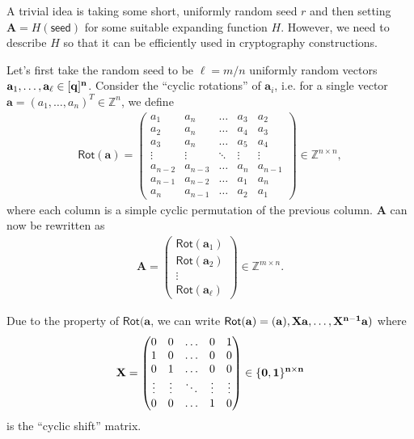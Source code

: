 \documentclass[cryptography,review,submit,pdftex,moreauthors,amsmath,amssymb,aps,strict]{Definitions/mdpi}
\begin{document}
A trivial idea is taking some short, uniformly random seed $r$ and then setting $\mathbf{A} = H(\textsf{seed})$ for some suitable expanding function $H$. However, we need to describe $H$ so that it can be efficiently used in cryptography constructions. 


Let's first take the random seed to be $\ell = m/n$ uniformly random vectors $\mathbf{a}_1,\dots,\bf{a_{\ell}}\in[q]^n$. Consider the ``cyclic rotations'' of $\mathbf{a}_i$, i.e. for a single vector $\mathbf{a}=(a_1,\dots,a_n)^T\in\mathbb{Z}^n$, we define
\begin{align}
    \mathsf{Rot}(\mathbf{a})=
    \begin{pmatrix}
    a_1 & a_n &\dots& a_3 & a_2\\
    a_2 & a_n &\dots& a_4 & a_3\\
    a_3 & a_n &\dots& a_5 & a_4\\
    \vdots & \vdots &\ddots& \vdots & \vdots\\
    a_{n-2} & a_{n-3} &\dots& a_n & a_{n-1}\\
    a_{n-1} & a_{n-2} &\dots& a_1 & a_n\\
    a_{n} & a_{n-1} &\dots& a_2 & a_1
    \end{pmatrix}\in\mathbb{Z}^{n\times n},
\end{align}
    where each column is a simple cyclic permutation of the previous column. 
    $\mathbf{A}$ can now be rewritten as
\begin{align}
    \mathbf{A}=
    \begin{pmatrix}
    \mathsf{Rot}(\mathbf{a}_1)\\
    \mathsf{Rot}(\mathbf{a}_2)\\
    \vdots\\
    \mathsf{Rot}(\mathbf{a}_{\ell})
    \end{pmatrix}\in\mathbb{Z}^{m\times n}.
\end{align}

\noindent Due to the property of $\mathsf{Rot}(\mathbf{a}$, we can write $\mathsf{Rot}(\mathbf{a})=(\mathbf{a}),\bf{X}\mathbf{a},\dots,X^{n-1}\mathbf{a})$ 
where 
\begin{align}
    \bf{X}=
    \begin{pmatrix}
    0 & 0 &\dots& 0 & 1\\
    1 & 0 &\dots& 0 & 0\\
    0 & 1 &\dots& 0 & 0\\
    \vdots & \vdots &\ddots& \vdots & \vdots\\
    0 & 0 &\dots& 1 & 0
    \end{pmatrix}\in\{0,1\}^{n\times n}
\end{align}
    is the ``cyclic shift'' matrix. 
   
\end{document}
